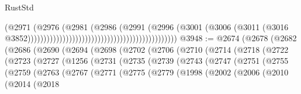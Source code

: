 \begin{lexlean}{RustStd}
\begin{coremodule}
                                                                              (@2971
                                                                                (@2976
                                                                                  (@2981
                                                                                    (@2986
                                                                                      (@2991
                                                                                        (@2996
                                                                                          (@3001
                                                                                            (@3006
                                                                                              (@3011
                                                                                                (@3016
                                                                                                  @3852)))))))))))))))))))))))))))))))))))))))))))))))
@3948 := @2674
    (@2678
      (@2682
        (@2686
          (@2690
            (@2694
              (@2698
                (@2702
                  (@2706
                    (@2710
                      (@2714
                        (@2718
                          (@2722
                            (@2723
                              (@2727
                                (@1256
                                  (@2731
                                    (@2735
                                      (@2739
                                        (@2743
                                          (@2747
                                            (@2751
                                              (@2755
                                                (@2759
                                                  (@2763
                                                    (@2767
                                                      (@2771
                                                        (@2775
                                                          (@2779
                                                            (@1998
                                                              (@2002
                                                                (@2006
                                                                  (@2010
                                                                    (@2014
                                                                      (@2018

\end{coremodule}
\end{lexlean}
